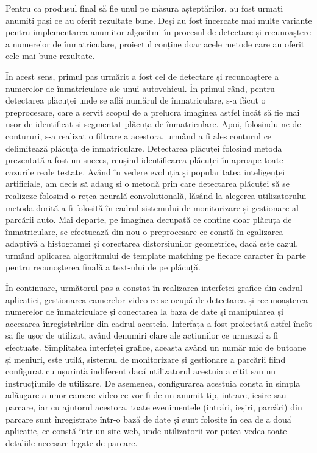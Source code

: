 \documentclass[12pt]{article}
\begin{document}
Pentru ca produsul final s\u{a} fie unul pe m\u{a}sura aștept\u{a}rilor, au fost urmați anumiți pași ce au oferit rezultate bune. Deși au fost \^{i}ncercate mai multe variante pentru implementarea anumitor algoritmi \^{i}n procesul de detectare și recunoaștere a numerelor de \^{i}nmatriculare, proiectul conține doar acele metode care au oferit cele mai bune rezultate. 

\^{I}n acest sens, primul pas urm\u{a}rit a fost cel de detectare și recunoaștere a numerelor de \^{i}nmatriculare ale unui autovehicul. \^{I}n primul r\^{a}nd, pentru detectarea pl\u{a}cuței unde se afl\u{a} num\u{a}rul de \^{i}nmatriculare, s-a f\u{a}cut o preprocesare, care a servit scopul de a prelucra imaginea astfel \^{i}nc\^{a}t s\u{a} fie mai ușor de identificat și segmentat pl\u{a}cuța de \^{i}nmatriculare. Apoi, folosindu-ne de contururi, s-a realizat o filtrare a acestora, urm\^{a}nd a fi ales conturul ce delimiteaz\u{a} pl\u{a}cuța de \^{i}nmatriculare. Detectarea pl\u{a}cuței folosind metoda prezentat\u{a} a fost un succes, reușind identificarea pl\u{a}cuței \^{i}n aproape toate cazurile reale testate. Av\^{a}nd \^{i}n vedere evoluția și popularitatea inteligenței artificiale, am decis s\u{a} adaug și o metod\u{a} prin care detectarea pl\u{a}cuței s\u{a} se realizeze folosind o rețea neural\u{a} convoluțional\u{a}, l\u{a}s\^{a}nd la alegerea utilizatorului metoda dorit\u{a} a fi folosit\u{a} \^{i}n cadrul sistemului de monitorizare și gestionare al parc\u{a}rii auto. Mai departe, pe imaginea decupat\u{a} ce conține doar pl\u{a}cuța de \^{i}nmatriculare, se efectueaz\u{a} din nou o preprocesare ce const\u{a} \^{i}n egalizarea adaptiv\u{a} a histogramei și corectarea distorsiunilor geometrice, dac\u{a} este cazul, urm\^{a}nd aplicarea algoritmului de template matching pe fiecare caracter \^{i}n parte pentru recunoșterea final\u{a} a text-ului de pe pl\u{a}cuț\u{a}.

\^{I}n continuare, urm\u{a}torul pas a constat \^{i}n realizarea interfeței grafice din cadrul aplicației, gestionarea camerelor video ce se ocup\u{a} de detectarea și recunoașterea numerelor de \^{i}nmatriculare și conectarea la baza de date și manipularea și accesarea \^{i}nregistr\u{a}rilor din cadrul acesteia. Interfața a fost proiectat\u{a} astfel \^{i}nc\^{a}t s\u{a} fie ușor de utilizat, av\^{a}nd denumiri clare ale acțiunilor ce urmeaz\u{a} a fi efectuate. Simplitatea interfeței grafice, aceasta av\^{a}nd un num\u{a}r mic de butoane și meniuri, este util\u{a}, sistemul de monitorizare și gestionare a parc\u{a}rii fiind configurat cu ușurinț\u{a} indiferent dac\u{a} utilizatorul acestuia a citit sau nu instrucțiunile de utilizare. De asemenea, configurarea acestuia const\u{a} \^{i}n simpla ad\u{a}ugare a unor camere video ce vor fi de un anumit tip, intrare, ieșire sau parcare, iar cu ajutorul acestora, toate evenimentele (intr\u{a}ri, ieșiri, parc\u{a}ri) din parcare sunt \^{i}nregistrate \^{i}ntr-o baz\u{a} de date și sunt folosite \^{i}n cea de a dou\u{a} aplicație, ce const\u{a} \^{i}ntr-un site web, unde utilizatorii vor putea vedea toate detaliile necesare legate de parcare.
\end{document}
